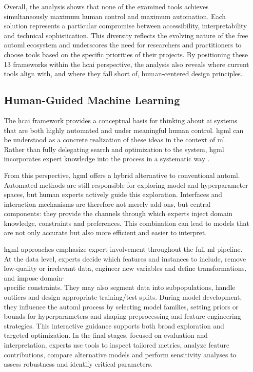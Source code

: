 \documentclass[twoside,final]{Contexto}
\begin{document}
Overall, the analysis shows that none of the examined tools achieves simultaneously maximum human control and maximum automation. Each solution represents a particular compromise between accessibility, interpretability and technical sophistication. This diversity reflects the evolving nature of the free \gls{automl} ecosystem and underscores the need for researchers and practitioners to choose tools based on the specific priorities of their projects. By positioning these 13 frameworks within the \gls{hcai} perspective, the analysis also reveals where current tools align with, and where they fall short of, human-centered design principles.

\subsection{Human-Guided Machine Learning}
\label{subsec:hgml}

The \gls{hcai} framework provides a conceptual basis for thinking about \gls{ai} systems that are both highly automated and under meaningful human control. \gls{hgml} can be understood as a concrete realization of these ideas in the context of \gls{ml}. Rather than fully delegating search and optimization to the system, \gls{hgml} incorporates expert knowledge into the process in a systematic way \cite{gil2019towards}.

From this perspective, \gls{hgml} offers a hybrid alternative to conventional \gls{automl}. Automated methods are still responsible for exploring model and hyperparameter spaces, but human experts actively guide this exploration. Interfaces and interaction mechanisms are therefore not merely add‑ons, but central components: they provide the channels through which experts inject domain knowledge, constraints and preferences. This combination can lead to models that are not only accurate but also more efficient and easier to interpret.

\gls{hgml} approaches emphasize expert involvement throughout the full \gls{ml} pipeline. At the data level, experts decide which features and instances to include, remove low‑quality or irrelevant data, engineer new variables and define transformations, and impose domain‑\\specific constraints. They may also segment data into subpopulations, handle outliers and design appropriate training/test splits. During model development, they influence the \gls{automl} process by selecting model families, setting priors or bounds for hyperparameters and shaping preprocessing and feature engineering strategies. This interactive guidance supports both broad exploration and targeted optimization. In the final stages, focused on evaluation and interpretation, experts use tools to inspect tailored metrics, analyze feature contributions, compare alternative models and perform sensitivity analyses to assess robustness and identify critical parameters.
\end{document}

